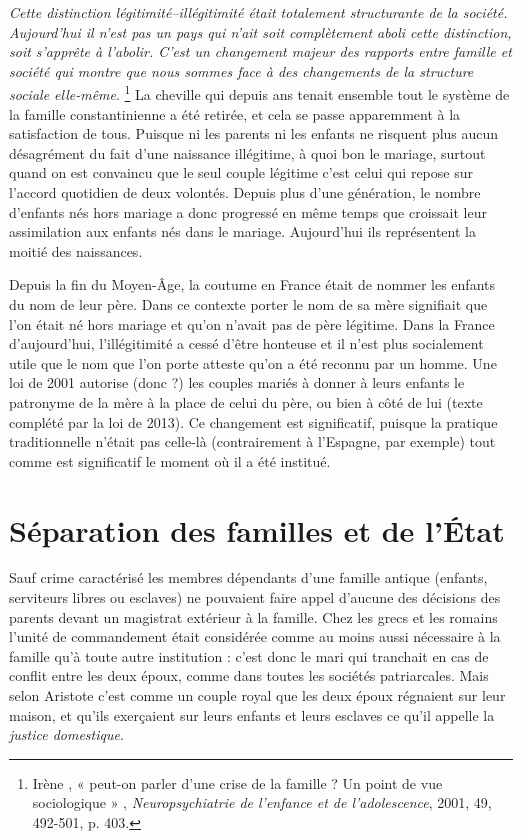  {\emph{Cette distinction légitimité--illégitimité était totalement structurante de la société. Aujourd'hui il n'est pas un pays qui n'ait soit complètement aboli cette distinction, soit s'apprête à l'abolir. C'est un changement majeur des rapports entre famille et société qui montre que nous sommes face à des changements de la structure sociale elle-même}.%
\footnote{Irène , « peut-on parler d'une crise de la famille ? Un point de vue sociologique » , \emph{Neuropsychiatrie de l'enfance et de l'adolescence}, 2001, 49, 492-501, p. 403.}%
} La cheville qui depuis  ans tenait ensemble tout le système de la famille constantinienne a été retirée, et cela se passe apparemment à la satisfaction de tous. Puisque ni les parents ni les enfants ne risquent plus aucun désagrément du fait d'une naissance illégitime, à quoi bon le mariage, surtout quand on est convaincu que le seul couple légitime c'est celui qui repose sur l'accord quotidien de deux volontés. Depuis plus d'une génération, le nombre d'enfants nés hors mariage a donc progressé en même temps que croissait leur assimilation aux enfants nés dans le mariage. Aujourd'hui ils représentent la moitié des naissances. 

 Depuis la fin du Moyen-Âge, la coutume en France était de nommer les enfants du nom de leur père. Dans ce contexte porter le nom de sa mère signifiait que l'on était né hors mariage et qu'on n'avait pas de père légitime. Dans la France d'aujourd'hui, l'illégitimité a cessé d'être honteuse et il n'est plus socialement utile que le nom que l'on porte atteste qu'on a été reconnu par un homme. Une loi de 2001 autorise (donc ?) les couples mariés à donner à leurs enfants le patronyme de la mère à la place de celui du père, ou bien à côté de lui (texte complété par la loi  de 2013). Ce changement est significatif, puisque la pratique traditionnelle n'était pas celle-là (contrairement à l'Espagne, par exemple) tout comme est significatif le moment où il a été institué. 


\section{Séparation des familles et de l'État}

 Sauf crime caractérisé les membres dépendants d'une famille antique (enfants, serviteurs libres ou esclaves) ne pouvaient faire appel d'aucune des décisions des parents devant un magistrat extérieur à la famille. Chez les grecs et les romains l'unité de commandement était considérée comme au moins aussi nécessaire à la famille qu'à toute autre institution : c'est donc le mari qui tranchait en cas de conflit entre les deux époux, comme dans toutes les sociétés patriarcales. Mais selon Aristote c'est comme un couple royal que les deux époux régnaient sur leur maison, et qu'ils exerçaient sur leurs enfants et leurs esclaves ce qu'il appelle la \emph{justice domestique}. 
 
